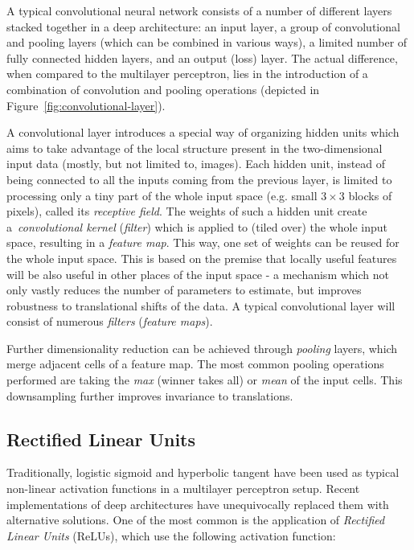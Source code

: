 \documentclass{article}
\begin{document}
A typical convolutional neural network consists of a number of different layers stacked together in a deep architecture: an input layer, a group of convolutional and pooling layers (which can be combined in various ways), a limited number of fully connected hidden layers, and an output (loss) layer. The actual difference, when compared to the multilayer perceptron, lies in the introduction of a combination of convolution and pooling operations (depicted in Figure~\ref{fig:convolutional-layer}).

A convolutional layer introduces a special way of organizing hidden units which aims to take advantage of the local structure present in the two-dimensional input data (mostly, but not limited to, images). Each hidden unit, instead of being connected to all the inputs coming from the previous layer, is limited to processing only a tiny part of the whole input space (e.g. small $3\times3$ blocks of pixels), called its \textit{receptive field}. The weights of such a hidden unit create a~\textit{convolutional kernel} (\textit{filter}) which is applied to (tiled over) the whole input space, resulting in a \textit{feature map}. This way, one set of weights can be reused for the whole input space. This is based on the premise that locally useful features will be also useful in other places of the input space - a mechanism which not only vastly reduces the number of parameters to estimate, but improves robustness to translational shifts of the data. A typical convolutional layer will consist of numerous \textit{filters} (\textit{feature maps}).

Further dimensionality reduction can be achieved through \textit{pooling} layers, which merge adjacent cells of a feature map. The most common pooling operations performed are taking the \textit{max} (winner takes all) or \textit{mean} of the input cells. This downsampling further improves invariance to translations.

\subsection{Rectified Linear Units}

Traditionally, logistic sigmoid and hyperbolic tangent have been used as typical non-linear activation functions in a multilayer perceptron setup. Recent implementations of deep architectures have unequivocally replaced them with alternative solutions. One of the most common is the application of \textit{Rectified Linear Units} (ReLUs), which use the following activation function:
\end{document}
